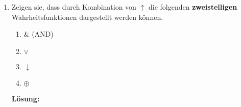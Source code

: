 \documentclass[paper=a4,fontsize=11pt]{scrartcl}%
\numberwithin{equation}{section}
\newenvironment{solution}
	{
		\color{Blue}
		\textbf{Lösung:}
	}{}
\begin{document}
\begin{enumerate}
\begin{solution}
\begin{enumerate}
\begin{proof}
$\top$ kann durch kombiniertes Anwenden von $\uparrow$ dargestellt werden\\
aus a) folgt: $(A \uparrow A) \Leftrightarrow \neg A$ daraus folgert: $(A \uparrow A) \uparrow A \Leftrightarrow \neg( A) \uparrow A \Leftrightarrow \top $ da A und seine Negation mittels NAND immer TRUE liefert.
\end{proof}
\item $\bot$
\begin{proof}
$\bot$ kann durch kombiniertes Anwenden von $\uparrow$ dargestellt werden\\
Idee: Kontradiktion als Negation der Tautologie, die Tautologie wird mittels $\neg$ invertiert.
$ \Leftrightarrow \neg \top \Leftrightarrow \bot$  da die Kontradiktion die Inversion der Tautologie ist - also unsere Voraussetzung\\
$ \Leftrightarrow (A \uparrow A) \uparrow \top$ die Negation aus a) als NAND\\
$ \Leftrightarrow (A \uparrow A) \uparrow (A \uparrow \neg A)$  die Tautologie aus c) in NAND \\
$ \Leftrightarrow (A \uparrow A ) \uparrow (A \uparrow (A \uparrow A )) $ die zweite Negation in der Tautologie als NAND.
\end{proof}
\end{enumerate}
	\end{solution}
	\item Zeigen sie, dass durch Kombination von $ \uparrow$ die folgenden \textbf{zweistelligen} Wahrheitsfunktionen dargestellt werden können.
	\begin{enumerate}
		\item \& (AND)
		\item $\lor$
		\item $\downarrow$
		\item $\oplus$
	\end{enumerate}
	
	\begin{solution}
	

\end{solution}
\end{enumerate}
\end{document}
